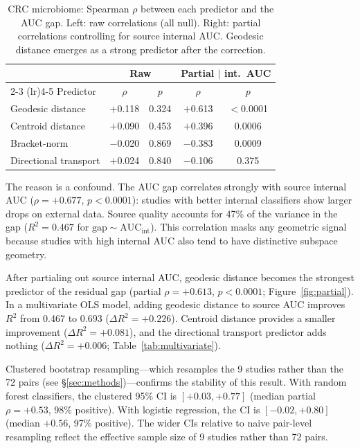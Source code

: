 \documentclass{article}
\begin{document}
\begin{table}[t]
\centering
\caption{CRC microbiome: Spearman $\rho$ between each predictor and the AUC gap. Left: raw correlations (all null). Right: partial correlations controlling for source internal AUC. Geodesic distance emerges as a strong predictor after the correction.}
\label{tab:raw_crc}
\begin{tabular}{lcccc}
\toprule
 & \multicolumn{2}{c}{Raw} & \multicolumn{2}{c}{Partial $|$ int.\ AUC} \\
\cmidrule(lr){2-3} \cmidrule(lr){4-5}
Predictor & $\rho$ & $p$ & $\rho$ & $p$ \\
\midrule
Geodesic distance        & $+$0.118 & 0.324 & $+$0.613 & $<$0.0001 \\
Centroid distance        & $+$0.090 & 0.453 & $+$0.396 & 0.0006 \\
Bracket-norm             & $-$0.020 & 0.869 & $-$0.383 & 0.0009 \\
Directional transport    & $+$0.024 & 0.840 & $-$0.106 & 0.375 \\
\bottomrule
\end{tabular}
\end{table}

The reason is a confound. The AUC gap correlates strongly with source internal AUC ($\rho = +0.677$, $p < 0.0001$): studies with better internal classifiers show larger drops on external data. Source quality accounts for 47\% of the variance in the gap ($R^2 = 0.467$ for $\text{gap} \sim \text{AUC}_{\mathrm{int}}$). This correlation masks any geometric signal because studies with high internal AUC also tend to have distinctive subspace geometry.

After partialing out source internal AUC, geodesic distance becomes the strongest predictor of the residual gap (partial $\rho = +0.613$, $p < 0.0001$; Figure~\ref{fig:partial}). In a multivariate OLS model, adding geodesic distance to source AUC improves $R^2$ from 0.467 to 0.693 ($\Delta R^2 = +0.226$). Centroid distance provides a smaller improvement ($\Delta R^2 = +0.081$), and the directional transport predictor adds nothing ($\Delta R^2 = +0.006$; Table~\ref{tab:multivariate}).

Clustered bootstrap resampling---which resamples the 9 studies rather than the 72 pairs (see \S\ref{sec:methods})---confirms the stability of this result. With random forest classifiers, the clustered 95\% CI is $[+0.03, +0.77]$ (median partial $\rho = +0.53$, 98\% positive). With logistic regression, the CI is $[-0.02, +0.80]$ (median $+0.56$, 97\% positive). The wider CIs relative to naive pair-level resampling reflect the effective sample size of 9 studies rather than 72 pairs.
\end{document}

